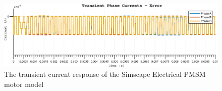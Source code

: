 \begin{figure}[htb]
\begingroup
\tikzset{}
 \centerline{\includegraphics[width=1\columnwidth]{.//Figure/EPS/err_currents.eps}}
 \endgroup
 \caption{The transient current response of the Simscape Electrical PMSM motor model}
 \label{fig:pe_current_trans}
\end{figure}